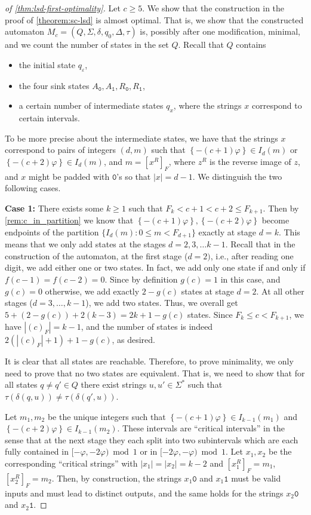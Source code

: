 \documentclass[12pt,runningheads]{llncs}
\newcommand{\tO}{\mathtt{0}}
\newcommand{\tL}{\mathtt{1}}
\renewcommand{\phi}{\varphi}
\newcommand{\fract}[1]{\left\{ #1 \right\}}
\newcommand{\caseI}[1]{\medskip\noindent\textbf{Case #1:}}
\begin{document}
\begin{proof}[of \cref{thm:lsd-first-optimality}]
Let $c\geq 5$. We show that the construction in the proof of \cref{theorem:sc-lsd} is almost optimal. That is, we show that the constructed automaton $M_c=(Q,\Sigma,\delta,q_0,\Delta,\tau)$ is, possibly after one modification, minimal, and we count the number of states in the set $Q$.
Recall that $Q$ contains \begin{itemize}
    \item the initial state $q_\varepsilon$,
    \item the four sink states $A_{\tO},A_{\tL}, R_{\tO},R_{\tL}$,
    \item a certain number of intermediate states $q_x$, where the strings $x$ correspond to certain intervals. 
\end{itemize}
To be more precise about the intermediate states, we have that the strings $x$ correspond to pairs of integers $(d,m)$ such that $\fract{-(c+1)\phi} \in I_d(m)$ or $\fract{-(c+2)\phi} \in I_d(m)$, and $m = [x^R]_F$, where $z^R$ is the reverse image of $z$, and $x$ might be padded with $\tO$'s so that $|x| = d-1$. We distinguish the two following cases.

\caseI{1} There exists some $k\geq 1$ such that $F_k < c+1<c+2 \leq F_{k+1}$. Then by \cref{rem:c_in_partition} we know that $\fract{-(c+1)\phi}, \fract{-(c+2)\phi}$ become endpoints of the partition $\{I_{d}(m)\colon 0\leq m < F_{d+1}\}$ exactly at stage $d = k$.
This means that we only add states at the stages $d=2,3,\ldots k-1$.
Recall that in the construction of the automaton, at the first stage ($d=2)$, i.e., after reading one digit, we add either one or two states. In fact, we add only one state if and only if $f(c-1)= f(c-2) = 0$. Since by definition $g(c) = 1$ in this case, and $g(c) = 0$ otherwise, we add exactly $2-g(c)$ states at stage $d = 2$.
At all other stages ($d = 3, \ldots, k-1$), we add two states. Thus, we overall get $5 + (2 - g(c)) + 2(k-3) = 2k + 1 - g(c)$ states.
Since $F_k \leq c < F_{k+1}$, we have $|(c)_F| = k-1$, and the number of states is indeed $2(|(c)_F|+1)+1-g(c)$, as desired. 

It is clear that all states are reachable. Therefore, to prove minimality, we only need to prove that no two states are equivalent.
That is, we need to show that for all states $q\neq q' \in Q$ there exist strings $u,u' \in \Sigma^*$ such that $\tau(\delta(q,u)) \neq \tau(\delta(q',u))$.

Let $m_1, m_2$ be the unique integers such that $\fract{-(c+1)\phi} \in I_{k-1}(m_1)$ and $\fract{-(c+2)\phi} \in I_{k-1}(m_2)$. These intervals are ``critical intervals'' in the sense that at the next stage they each split into two subintervals which are each fully contained in $[-\phi, -2\phi) \bmod 1$ or in $[-2\phi, -\phi)\bmod 1$. Let $x_1, x_2$ be the corresponding ``critical strings'' with $|x_1| = |x_2| = k-2$ and $[x_1^R]_F = m_1$, $[x_2^R]_F = m_2$. 
Then, by construction, the strings $x_1\tO$ and $x_1\tL$ must be valid inputs and must lead to distinct outputs, and the same holds for the strings $x_2\tO$ and $x_2\tL$.


\end{proof}
\end{document}

